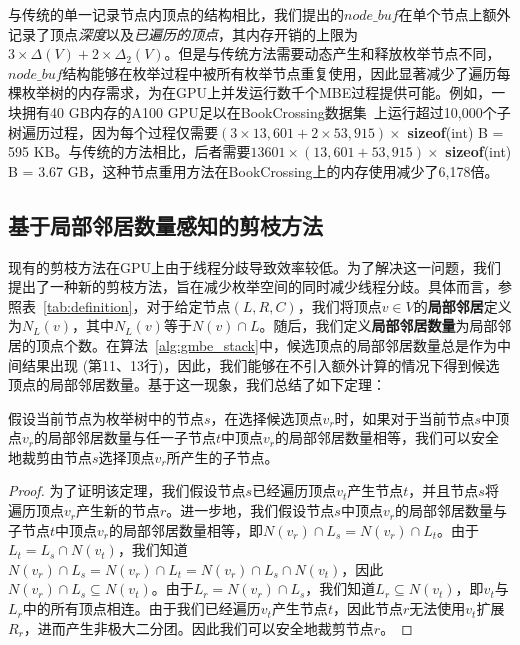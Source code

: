 与传统的单一记录节点内顶点的结构相比，我们提出的$node\_buf$在单个节点上额外记录了顶点\textit{深度}以及\textit{已遍历的顶点}，其内存开销的上限为$3 \times \Delta(V) + 2 \times \Delta_2(V)$。但是与传统方法需要动态产生和释放枚举节点不同，$node\_buf$结构能够在枚举过程中被所有枚举节点重复使用，因此显著减少了遍历每棵枚举树的内存需求，为在GPU上并发运行数千个MBE过程提供可能。例如，一块拥有40 GB内存的A100 GPU足以在BookCrossing数据集~\cite{konect}上运行超过10,000个子树遍历过程，因为每个过程仅需要$(3 \times 13,601 + 2 \times 53,915) \times$ \textbf{sizeof}(int) B = 595 KB。与传统的方法相比，后者需要$13601 \times (13,601 + 53,915)\times$ \textbf{sizeof}(int) B = 3.67 GB，这种节点重用方法在BookCrossing上的内存使用减少了6,178倍。

\subsection{基于局部邻居数量感知的剪枝方法}
\label{subsec:gmbe_prune}

现有的剪枝方法在GPU上由于线程分歧导致效率较低。为了解决这一问题，我们提出了一种新的剪枝方法，旨在减少枚举空间的同时减少线程分歧。具体而言，参照表~\ref{tab:definition}，对于给定节点$(L, R, C)$，我们将顶点$v \in V$的\textbf{局部邻居}定义为$N_L(v)$，其中$N_L(v)$等于$N(v) \cap L$。随后，我们定义\textbf{局部邻居数量}为局部邻居的顶点个数。在算法~\ref{alg:gmbe_stack}中，候选顶点的局部邻居数量总是作为中间结果出现 (第11、13行)，因此，我们能够在不引入额外计算的情况下得到候选顶点的局部邻居数量。基于这一现象，我们总结了如下定理：

\begin{theorem}
  假设当前节点为枚举树中的节点$s$，在选择候选顶点$v_r$时，如果对于当前节点$s$中顶点$v_r$的局部邻居数量与任一子节点$t$中顶点$v_r$的局部邻居数量相等，我们可以安全地裁剪由节点$s$选择顶点$v_r$所产生的子节点。
  \label{theorem:gmbe_prune}
\end{theorem}

\begin{proof}
  为了证明该定理，我们假设节点$s$已经遍历顶点$v_t$产生节点$t$，并且节点$s$将遍历顶点$v_r$产生新的节点$r$。进一步地，我们假设节点$s$中顶点$v_r$的局部邻居数量与子节点$t$中顶点$v_r$的局部邻居数量相等，即$N(v_r) \cap L_s =N(v_r) \cap L_t$。由于$L_t = L_s\cap N(v_t)$，我们知道$N(v_r) \cap L_s =N(v_r) \cap L_t= N(v_r) \cap L_s\cap N(v_t)$，因此$N(v_r) \cap L_s \subseteq N(v_t)$。由于$L_r = N(v_r)\cap L_s$，我们知道$L_r\subseteq N(v_t)$，即$v_t$与$L_r$中的所有顶点相连。由于我们已经遍历$v_t$产生节点$t$，因此节点$r$无法使用$v_t$扩展$R_r$，进而产生非极大二分团。因此我们可以安全地裁剪节点$r$。

\end{proof}

